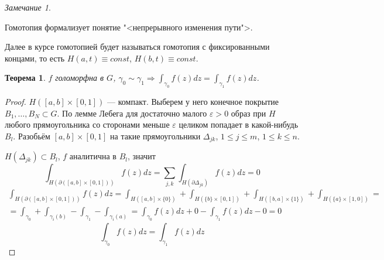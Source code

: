 \documentclass[12pt]{article}
\newcommand{\Ra}{\Rightarrow}
\newcounter{cnt}
\theoremstyle{thmnote}
\newtheorem{theorem}[cnt]{Теорема}
\theoremstyle{remark}
\newtheorem*{remark}{Замечание}
\theoremstyle{defnote}
\begin{document}
\begin{remark}
\begin{center}
    \end{center}

    Гомотопия формализует понятие "<непрерывного изменения пути">.

    Далее в курсе гомотопией будет называться гомотопия с фиксированными концами, то есть $H(a, t) \equiv const$, $H(b, t) \equiv const$.
\end{remark}

\begin{theorem}
    $f$ голоморфна в $G$, $\gamma_0 \sim \gamma_1 \Ra \int_{\gamma_0} f(z)dz = \int_{\gamma_1} f(z)dz$.
\end{theorem}
\begin{proof}
    $H([a, b] \times [0, 1])$ --- компакт. Выберем у него конечное покрытие $B_1, \dots, B_N \subset G$. По лемме Лебега для достаточно малого $\varepsilon > 0$ образ при $H$ любого прямоугольника со сторонами меньше $\varepsilon$ целиком попадает в какой-нибудь $B_l$. Разобьём $[a, b] \times [0, 1]$ на такие прямоугольники $\Delta_{jk}$, $1 \leq j \leq m$, $1 \leq k \leq n$.

    $H(\Delta_{jk}) \subset B_l$, $f$ аналитична в $B_l$, значит
    \begin{equation*}
        \int_{H(\partial ([a, b] \times [0, 1]))} f(z)dz = \underset{j, k}{\sum} \int_{H(\partial \Delta_{jk})} f(z)dz = 0
    \end{equation*}
    \begin{gather*}
        \int_{H(\partial([a, b] \times [0, 1]))} f(z)dz = \int_{H([a, b] \times \{0\})} + \int_{H(\{b\} \times [0, 1])} + \int_{H([b, a] \times \{1\})} + \int_{H(\{a\} \times [1, 0])} = \\
        = \int_{\gamma_0} + \int_{\gamma_i(b)} - \int_{\gamma_1} - \int_{\gamma_i(a)} = \int_{\gamma_0} f(z)dz + 0 - \int_{\gamma_1} f(z)dz - 0 = 0
    \end{gather*}
    \begin{equation*}
        \int_{\gamma_0} f(z)dz = \int_{\gamma_1} f(z)dz
    \end{equation*}
\end{proof}
\end{document}
